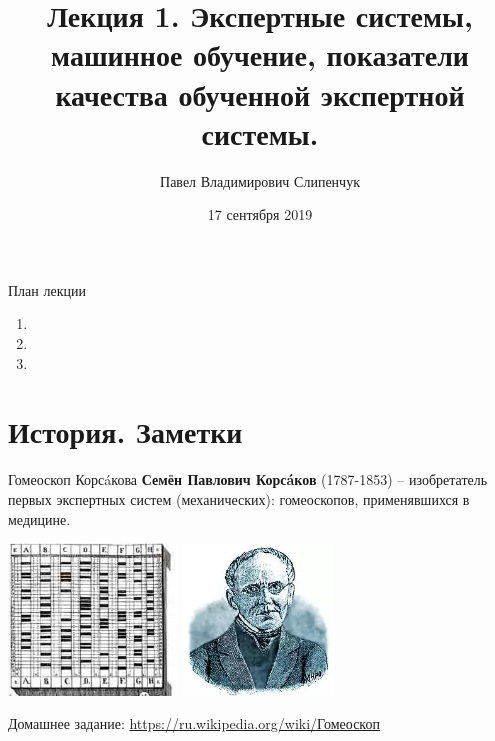 \documentclass{beamer}
\title{Лекция 1. Экспертные системы, машинное обучение, показатели качества обученной экспертной системы.}
\date{17 сентября 2019}
\author{Павел Владимирович Слипенчук}
\institute{Москва, МГТУ им.Бауманка,\\ каф.ИУ-8, КИБ}
\begin{document}
  \maketitle
    
  \begin{frame}{План лекции}
    \begin{enumerate}
    \item {}
    \item {}
    \item {}
	\end{enumerate}
 \end{frame}
 
 \section{История. Заметки}\label{section:history_remarks}
  
  \begin{frame}{Гомеоскоп Корсáкова}
    \textbf{Семён Павлович Корсáков}
    (1787-1853) 
    -- изобретатель первых экспертных систем 
    (механических): гомеоскопов, применявшихся в медицине.  
    \begin{center}
    		\includegraphics[width=4.5cm]{../pic/gomeoskop.png}\centering
    		\includegraphics[width=4cm]{../pic/korsakov.png}\centering
    \end{center}
    Домашнее задание: \url{https://ru.wikipedia.org/wiki/Гомеоскоп}
  \end{frame}
  
\end{document}

